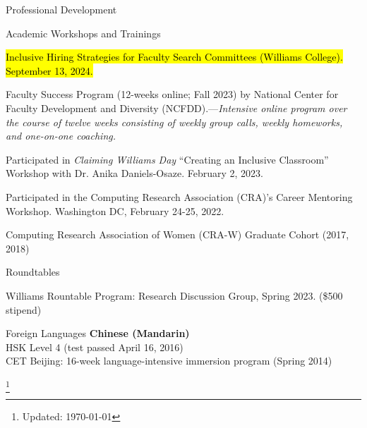 \documentclass{resume} %
\newcommand\blfootnote[1]{%
  \begingroup
  \renewcommand\thefootnote{}\footnote{#1}%
  \addtocounter{footnote}{-1}%
  \endgroup
}
\begin{document}
\begin{rSection}{Professional Development}


\begin{rSubsection}{Academic Workshops and Trainings}{}{}{}
\item \hl{Inclusive Hiring Strategies for Faculty Search Committees (Williams College). September 13, 2024.}
\item Faculty Success Program (12-weeks online; Fall 2023) by National Center for Faculty Development and Diversity (NCFDD).---\emph{Intensive online program over the course of twelve weeks consisting of weekly group calls, weekly homeworks, and one-on-one coaching.}
\item Participated in \emph{Claiming Williams Day} ``Creating an Inclusive Classroom'' Workshop with Dr. Anika Daniels-Osaze. February 2, 2023.
\item Participated in the Computing Research Association (CRA)'s Career Mentoring Workshop. Washington DC, February 24-25, 2022. 
\item Computing Research Association of Women (CRA-W) Graduate Cohort (2017, 2018)  
\end{rSubsection}

\begin{rSubsection}{Roundtables}{}{}{}
\item Williams Rountable Program: Research Discussion Group, Spring 2023. (\$500 stipend)
\end{rSubsection}
\end{rSection}

\begin{rSection}{Foreign Languages}
\textbf{Chinese (Mandarin)} \\
HSK Level 4 (test passed April 16, 2016) \\
CET Beijing: 16-week language-intensive immersion program (Spring 2014)
\end{rSection}

\blfootnote{Updated: \today}
\end{document}
